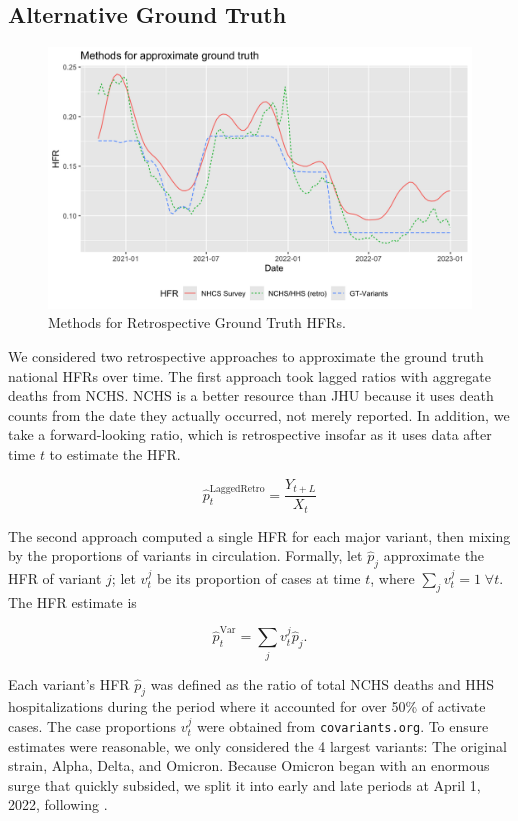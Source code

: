 \documentclass{article}
\begin{document}
\subsection{Alternative Ground Truth}\label{apx:alt_gt}

\begin{figure}
    \centering
    \includegraphics[width=0.8\linewidth]{Figs/ApproxGT.png}
    \caption{Methods for Retrospective Ground Truth HFRs.}
    \label{fig:approxGT}
\end{figure}

We considered two retrospective approaches to approximate the ground truth national HFRs over time. The first approach took lagged ratios with aggregate deaths from NCHS. NCHS is a better resource than JHU because it uses death counts from the date they actually occurred, not merely reported. In addition, we take a forward-looking ratio, which is retrospective insofar as it uses data after time $t$ to estimate the HFR.

\begin{equation}\label{eq:LaggedRetro}
    \hat{p}_t^{\text{LaggedRetro}} = \frac{Y_{t+L}}{X_t}
\end{equation}

The second approach computed a single HFR for each major variant, then mixing by the proportions of variants in circulation. Formally, let $\hat{p}_j$ approximate the HFR of variant $j$; let $v_t^j$ be its proportion of cases at time $t$, where $\sum_j v_t^j = 1 \; \forall t$. The HFR estimate is

$$\hat{p}_t^{\text{Var}} = \sum_j v_t^j \hat{p}_j.$$

Each variant's HFR $\hat p_j$ was defined as the ratio of total NCHS deaths and HHS hospitalizations during the period where it accounted for over 50\% of activate cases. The case proportions $v_t^j$ were obtained from \texttt{covariants.org}. To ensure estimates were reasonable, we only considered the 4 largest variants: The original strain, Alpha, Delta, and Omicron. Because Omicron began with an enormous surge that quickly subsided, we split it into early and late periods at April 1, 2022, following \cite{adjei2022mortality}.
\end{document}
